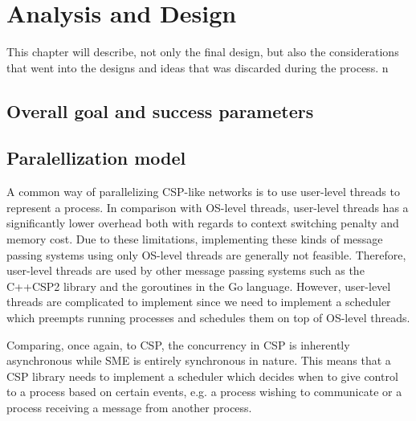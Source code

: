 \chapter{Analysis and Design}
This chapter will describe, not only the final design, but also the
considerations that went into the designs and ideas that was discarded
during the process.
n


\section{Overall goal and success parameters}





\section{Paralellization model}

A common way of parallelizing CSP-like networks is to use user-level
threads to represent a process. In comparison with OS-level threads,
user-level threads has a significantly lower overhead both with
regards to context switching penalty and memory cost. Due to these
limitations, implementing these kinds of message passing systems using
only OS-level threads are generally not feasible. Therefore,
user-level threads are used by other message passing systems such as
the C++CSP2 library and the goroutines in the Go language.  However,
user-level threads are complicated to implement since we need to
implement a scheduler which preempts  running processes and schedules them on top of OS-level
threads.


Comparing, once again, to CSP, the concurrency in CSP is inherently
asynchronous while SME is entirely synchronous in nature. This means
that a CSP library needs to implement a scheduler which decides when
to give control to a process based on certain events, e.g. a process
wishing to communicate or a process receiving a message from another
process.

